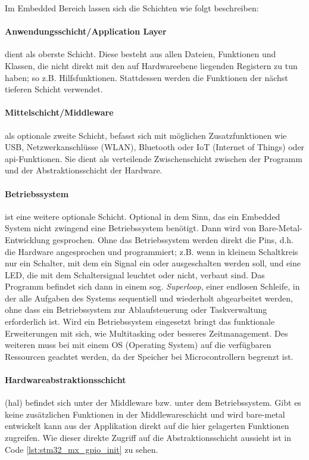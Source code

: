 Im Embedded Bereich lassen sich die Schichten wie folgt beschreiben:

\paragraph{Anwendungsschicht/Application Layer}
dient als oberste Schicht.
Diese besteht aus allen Dateien, Funktionen und Klassen, die nicht direkt mit den auf Hardwareebene liegenden Registern zu tun haben; so z.B. Hilfsfunktionen.
Stattdessen werden die Funktionen der nächst tieferen Schicht verwendet.

\paragraph{Mittelschicht/Middleware}
als optionale zweite Schicht, befasst sich mit möglichen Zusatzfunktionen wie USB, Netzwerkanschlüsse (WLAN), Bluetooth oder IoT (Internet of Things) oder \gls{api}-Funktionen.
Sie dient als verteilende Zwischenschicht zwischen der Programm und der Abstraktionsschicht der Hardware.

\paragraph{Betriebssystem} ist eine weitere optionale Schicht.
Optional in dem Sinn, das ein Embedded System nicht zwingend eine Betriebssystem benötigt.
Dann wird von Bare-Metal-Entwicklung gesprochen.
Ohne das Betriebssystem werden direkt die Pins, d.h. die Hardware angesprochen und programmiert; z.B. wenn in kleinem Schaltkreis nur ein Schalter, mit dem ein Signal ein oder ausgeschalten werden soll, und eine LED, die mit dem Schaltersignal leuchtet oder nicht, verbaut sind.
Das Programm befindet sich dann in einem sog. \textit{Superloop}, einer endlosen Schleife, in der alle Aufgaben des Systems sequentiell und wiederholt abgearbeitet werden, ohne dass ein Betriebssystem zur Ablaufsteuerung oder Taskverwaltung erforderlich ist.
Wird ein Betriebssystem eingesetzt bringt das funktionale Erweiterungen mit sich, wie Multitasking oder besseres Zeitmanagement.
Des weiteren muss bei mit einem OS (Operating System) auf die verfügbaren Ressourcen geachtet werden, da der Speicher bei Microcontrollern begrenzt ist.

\paragraph{Hardwareabstraktionsschicht} (\gls{hal}) befindet sich unter der Middleware bzw. unter dem Betriebssystem.
Gibt es keine zusätzlichen Funktionen in der Middlewareschicht und wird bare-metal entwickelt kann aus der Applikation direkt auf die hier gelagerten Funktionen zugreifen.
Wie dieser direkte Zugriff auf die Abstraktionsschicht aussieht ist in Code \cref{lst:stm32_mx_gpio_init}
zu sehen.
\clearpage

